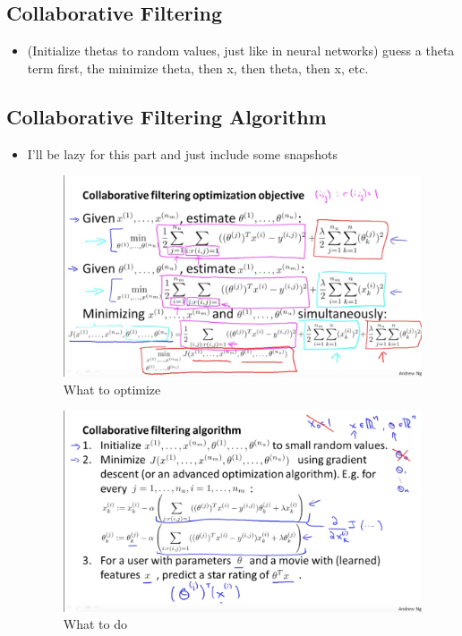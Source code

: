 \documentclass[]{article}
\begin{document}
	\subsection{Collaborative Filtering}
		\begin{itemize}
			\item (Initialize thetas to random values, just like in neural networks) guess a theta term first, the minimize theta, then x, then theta, then x, etc.
		\end{itemize}
		
	\subsection{Collaborative Filtering Algorithm}
		\begin{itemize}
			\item I'll be lazy for this part and just include some snapshots
			\begin{figure}[ht!]
				\includegraphics[width= 1.5\textwidth,center]{Collaborative_Filtering_Objective.png}
				\caption{What to optimize}
			\end{figure}
			\begin{figure}[ht!]
				\includegraphics[width= 1.5\textwidth,center]{Collaborative_Filtering_Algorithm.png}
				\caption{What to do}
			\end{figure}
		\end{itemize}
		
\end{document}
